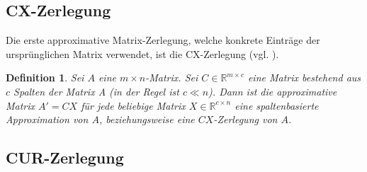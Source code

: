 \documentclass[12pt,a4paper,twoside]{article}
\newtheorem{Definition}[Satz]{Definition}
\begin{document}
	\subsection{CX-Zerlegung}
		\label{subsec:CX}
		Die erste approximative Matrix-Zerlegung, welche konkrete Einträge der ursprünglichen Matrix verwendet, ist die CX-Zerlegung (vgl. \citep{Drineas2009}). 
		\begin{Definition}
			Sei $A$ eine $m\times n$-Matrix. Sei $C\in \mathds{R}^{m\times c}$ eine Matrix bestehend aus $c$ Spalten der Matrix A (in der Regel ist $c\ll n$). Dann ist die approximative Matrix $A'=CX$ für jede beliebige Matrix $X\in \mathds{R}^{c\times n}$ eine spaltenbasierte Approximation von $A$, beziehungsweise eine $CX$-Zerlegung von $A$.
		\end{Definition}
	\subsection{CUR-Zerlegung}	
		\label{subsec:CUR}
\end{document}
